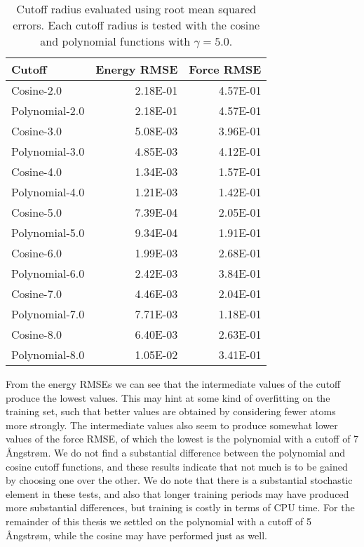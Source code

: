 \begin{table}[H]
\centering
\caption{Cutoff radius evaluated using root mean squared errors.
    Each cutoff radius is tested with the cosine and polynomial functions
    with $\gamma = 5.0$.}
\label{table:cutoffs}
\begin{tabular}{lrr}
\toprule
     Cutoff &  Energy RMSE &  Force RMSE \\
\midrule
     Cosine-2.0 &     2.18E-01 &    4.57E-01 \\
 Polynomial-2.0 &     2.18E-01 &    4.57E-01 \\
     Cosine-3.0 &     5.08E-03 &    3.96E-01 \\
 Polynomial-3.0 &     4.85E-03 &    4.12E-01 \\
     Cosine-4.0 &     1.34E-03 &    1.57E-01 \\
 Polynomial-4.0 &     1.21E-03 &    1.42E-01 \\
     Cosine-5.0 &     7.39E-04 &    2.05E-01 \\
 Polynomial-5.0 &     9.34E-04 &    1.91E-01 \\
     Cosine-6.0 &     1.99E-03 &    2.68E-01 \\
 Polynomial-6.0 &     2.42E-03 &    3.84E-01 \\
     Cosine-7.0 &     4.46E-03 &    2.04E-01 \\
 Polynomial-7.0 &     7.71E-03 &    1.18E-01 \\
     Cosine-8.0 &     6.40E-03 &    2.63E-01 \\
 Polynomial-8.0 &     1.05E-02 &    3.41E-01 \\
\bottomrule
\end{tabular}
\end{table}

From the energy RMSEs we can see that the intermediate values of the
cutoff produce the lowest values. This may hint at some kind
of overfitting on the training set,
such that better values are obtained by considering fewer atoms more strongly.
The intermediate values also
seem to produce somewhat lower values of the force RMSE,
of which the lowest is the polynomial with a cutoff of 7 Ångstrøm.
We do not find a substantial difference between the polynomial
and cosine cutoff functions, and these results indicate that not
much is to be gained by choosing one over the other.
We do note that there is a substantial
stochastic element in these tests, and also that longer training
periods may have produced more substantial differences, but
training is costly in terms of CPU time.
For the remainder
of this thesis we settled on the polynomial with a cutoff of 5 Ångstrøm,
while the cosine may have performed just as well.

